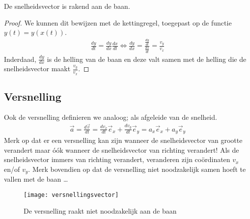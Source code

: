 \newpage

\begin{eigenschap}
De snelheidsvector is rakend aan de baan.
\end{eigenschap}
\begin{proof}
We kunnen dit bewijzen met de kettingregel, toegepast op de functie $y(t)=y(x(t))$.
\begin{eqnarray*}
 \frac{dy}{dt}=\frac{dy}{dx}\frac{dx}{dt}\Leftrightarrow\frac{dy}{dx}=\frac{\frac{dy}{dt}}{\frac{dx}{dt}}=\frac{v_y}{v_x}
\end{eqnarray*}
Inderdaad, $\frac{dy}{dx}$ is de helling van de baan en deze valt samen met de helling die de snelheidsvector maakt $\frac{v_y}{v_x}$.
\end{proof}

\subsection{Versnelling}

Ook de versnelling definieren we analoog; als afgeleide van de snelheid.
\begin{eqnarray*}
\vec{a}=\frac{d\vec{v}}{dt}=\frac{dv_x}{dt}\vec{e}_x+\frac{dv_y}{dt}\vec{e}_y=a_x\vec{e}_x+a_y\vec{e}_y
\end{eqnarray*}
Merk op dat er een versnelling kan zijn wanneer de snelheidsvector van grootte verandert maar \'o\'ok wanneer de snelheidsvector van richting verandert! Als de snelheidsvector immers van richting verandert, veranderen zijn co\"ordinaten $v_x$ en/of $v_y$. Merk bovendien op dat de versnelling niet noodzakelijk samen hoeft te vallen met de baan \ldots
\begin{figure}[h]
\centering
\texttt{[image: versnellingsvector]}
\caption{De versnelling raakt niet noodzakelijk aan de baan}
\end{figure}

\newpage


